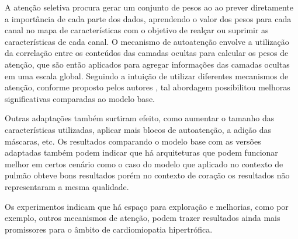 A atenção seletiva procura gerar um conjunto de pesos ao ao prever diretamente a importância de cada parte dos dados, aprendendo o valor dos pesos para cada canal no mapa de características com o objetivo de realçar ou suprimir as características de cada canal. O mecanismo de autoatenção envolve a utilização da correlação entre os conteúdos das camadas ocultas para calcular os pesos de atenção, que são então aplicados para agregar informações das camadas ocultas em uma escala global. Seguindo a intuição de utilizar diferentes mecanismos de atenção, conforme proposto pelos autores \cite{yangNeuralNetworkDesign2024a}, tal abordagem possibilitou melhoras significativas comparadas ao modelo base. 

Outras adaptações também surtiram efeito, como aumentar o tamanho das características utilizadas, aplicar mais blocos de autoatenção, a adição das máscaras, etc. Os resultados comparando o modelo base com as versões adaptadas também podem indicar que há arquiteturas que podem funcionar melhor em certos cenário como o caso do modelo que aplicado no contexto de pulmão obteve bons resultados porém no contexto de coração os resultados não representaram a mesma qualidade.

Os experimentos indicam que há espaço para exploração e melhorias, como por exemplo, outros mecanismos de atenção, podem trazer resultados ainda mais promissores para o âmbito de cardiomiopatia hipertrófica. 

